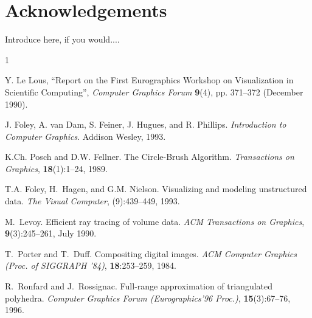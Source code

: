 \documentclass{egpubl}
\begin{document}
\section*{Acknowledgements}

Introduce here, if you would....


\begin{thebibliography}{1}

 Y. Le Lous,
``Report on the First Eurographics Workshop on Visualization in
Scientific Computing'', \emph{Computer Graphics Forum\/}
\textbf{9}(4), pp. 371--372 (December 1990).

J. Foley, A. van Dam, S. Feiner, J. Hugues, and R. Phillips.
\newblock \emph{Introduction to Computer Graphics}.
\newblock Addison Wesley, 1993.

K.Ch. Posch and D.W. Fellner.
\newblock The Circle-Brush Algorithm.
\newblock \emph{Transactions on Graphics}, \textbf{18}(1):1--24, 1989.

T.A. Foley, H.~Hagen, and G.M. Nielson.
\newblock Visualizing and modeling unstructured data.
\newblock \emph{The Visual Computer}, (9):439--449, 1993.

M.~Levoy.
\newblock Efficient ray tracing of volume data.
\newblock \emph{ACM Transactions on Graphics},
          \textbf{9}(3):245--261, July 1990.

T.~Porter and T.~Duff.
\newblock Compositing digital images.
\newblock \emph{ACM Computer Graphics (Proc. of SIGGRAPH '84)},
          \textbf{18}:253--259, 1984.

R.~Ronfard and J.~Rossignac.
\newblock Full-range approximation of triangulated polyhedra.
\newblock \emph{Computer Graphics Forum (Eurographics'96 Proc.)},
          \textbf{15}(3):67--76, 1996.

\end{thebibliography}
\end{document}
